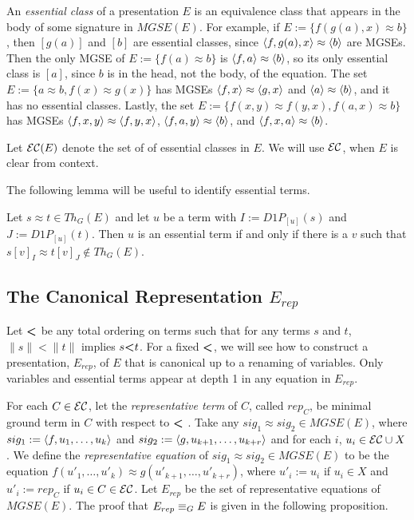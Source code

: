 An \emph{essential class} of a presentation $E$ is an equivalence class that appears in the body of some signature in $MGSE(E)$. %
For example, if $E := \{ f(g(a),x) \approx b\}$, then $[g(a)]$ and $[b]$ are essential classes, since $\langle f,g(a),x \rangle \approx \langle b \rangle$ are MGSEs.
Then the only MGSE of $E := \{ f(a) \approx b \}$ is $\langle f,a \rangle \approx \langle b \rangle$, so its only essential class is $[a]$, since $b$ is in the head, not the body, of the equation.
The set  $E := \{ a \approx b, f(x) \approx g(x) \}$ has MGSEs $\langle f,x \rangle \approx \langle g,x \rangle$ and $\langle a \rangle \approx \langle b \rangle$, and it has no essential classes.
Lastly, the set $E:= \{ f(x,y) \approx f(y,x), f(a,x)\approx b \}$ has MGSEs $\langle f,x,y \rangle \approx \langle f,y,x \rangle$, $\langle f,a,y \rangle\approx \langle b \rangle$, and $\langle f,x,a \rangle \approx \langle b \rangle$.

Let ${\mathcal{E}\mathcal{C}}(E)$ denote the set of of essential classes in $E$.
We will use ${\mathcal{E}\mathcal{C}}$, when $E$ is clear from context. 

The following lemma will be useful to identify essential terms.

\begin{lemma}
\label{ess_id}
Let $s \approx t \in Th_G(E)$ and let $u$ be a term with $I := D1P_{[u]}(s)$ and $J := D1P_{[u]}(t)$.
Then  $u$ is an essential term if and only if there is a $v$ such that $s[v]_I \approx t[v]_J \not\in Th_G(E)$.
\end{lemma}



\subsection{The Canonical Representation $E_{rep}$}
Let $\textbf{\textless}$ be any total ordering on terms such that for any terms $s$ and $t$, $\|s\| < \|t\|$ implies $s \textbf{\textless} t$.
For a fixed $\textbf{\textless}$, we will see how to construct a presentation, $E_{rep}$, of $E$ that is canonical up to a renaming of variables.
Only variables and essential terms appear at depth 1 in any equation in $E_{rep}$.

For each $C \in {\mathcal{E}\mathcal{C}}$, let the \emph{representative term} of $C$, called $rep_C$, be minimal ground term in $C$ with respect to $\textbf{\textless}$ . %
Take any $sig_1 \approx sig_2 \in MGSE(E)$, where $sig_1 := \langle f,u_1,\dots,u_k \rangle$ and $sig_2 := \langle g,u_{k+1},\dots,u_{k+r} \rangle$ and for each $i$, $u_i \in {\mathcal{E}\mathcal{C}} \cup X$. 
We define the \emph{representative equation} of $sig_1 \approx sig_2 \in MGSE(E)$ to be the equation $f(u'_1,\dots,u'_k) \approx g(u'_{k+1},\dots,u'_{k+r})$, where $u'_i := u_i$ if $u_i \in X$ and $u'_i := rep_C$ if $u_i \in C \in {\mathcal{E}\mathcal{C}}$. 
Let $E_{rep}$ be the set of representative equations of $MGSE(E)$.
The proof that $E_{rep} \equiv_G E$ is given in the following proposition.

